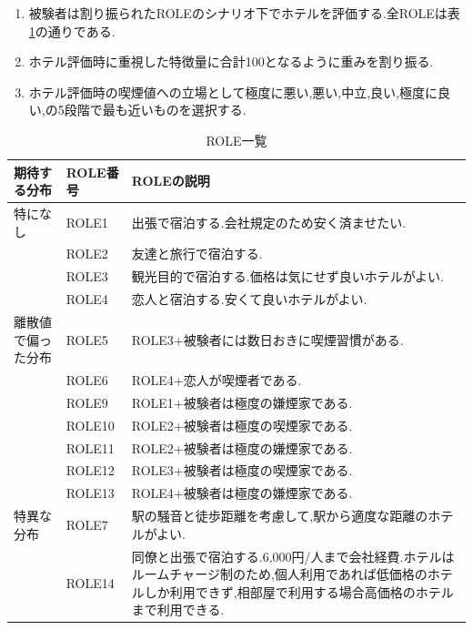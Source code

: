 \begin{enumerate}
  \item 被験者は割り振られたROLEのシナリオ下でホテルを評価する.全ROLEは表\ref{tbl:ROLE}の通りである.
  \item ホテル評価時に重視した特徴量に合計100となるように重みを割り振る.
  \item ホテル評価時の喫煙値への立場として極度に悪い,悪い,中立,良い,極度に良い,の5段階で最も近いものを選択する.
\end{enumerate}
\begin{table}[H]
  \begin{center} {
    \caption{ROLE一覧} \label{tbl:ROLE}
    \begin{tabular}{p{7em}lp{25em}} 
\hline
期待する分布 & ROLE番号 & ROLEの説明\\ \hline
特になし & ROLE1 &出張で宿泊する.会社規定のため安く済ませたい.\\ 
&ROLE2 & 友達と旅行で宿泊する.\\ 
&ROLE3 & 観光目的で宿泊する.価格は気にせず良いホテルがよい.\\ 
&ROLE4 & 恋人と宿泊する.安くて良いホテルがよい.\\ \hline
離散値で偏った分布&ROLE5 & ROLE3+被験者には数日おきに喫煙習慣がある.\\ 
&ROLE6 & ROLE4+恋人が喫煙者である.\\
&ROLE9 & ROLE1+被験者は極度の嫌煙家である.\\
&ROLE10 & ROLE2+被験者は極度の喫煙家である.\\ 
&ROLE11 & ROLE2+被験者は極度の嫌煙家である.\\ 
&ROLE12 & ROLE3+被験者は極度の喫煙家である.\\ 
&ROLE13 & ROLE4+被験者は極度の嫌煙家である.\\ \hline
特異な分布&ROLE7 & 駅の騒音と徒歩距離を考慮して,駅から適度な距離のホテルがよい.\\
&ROLE14 & 同僚と出張で宿泊する.6,000円/人まで会社経費.ホテルはルームチャージ制のため,個人利用であれば低価格のホテルしか利用できず,相部屋で利用する場合高価格のホテルまで利用できる.\\
\hline
    \end{tabular}
  }
  \end{center} %
\end{table}


